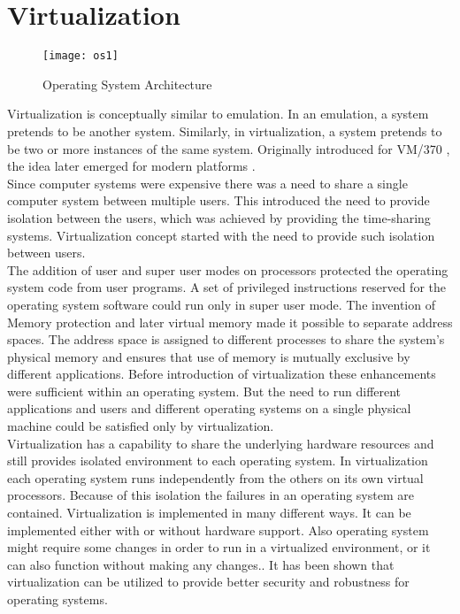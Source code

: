 \section{Virtualization}

\begin{figure}[!ht]
\centering
\texttt{[image: os1]}
\caption{Operating System Architecture}
\label{fig:OS}
\end{figure}
Virtualization is conceptually similar to emulation. In an emulation, a system pretends to be another system. Similarly, in virtualization, a system pretends to be two or more instances of the same system. Originally introduced for VM/370 \cite{Creasy:1981:OVT:1664853.1664863}, the idea later emerged for modern platforms \cite{Bugnion:1997:DRC:265924.265930}\cite{Rosenblum:2004:RVM:1016998.1017000}. 
\\
Since computer systems were expensive there was a need to share a single computer system between multiple users. This introduced the need to provide isolation between the users, which was achieved by providing the time-sharing systems. Virtualization concept started with the need to provide such isolation between users. 
\\
The addition of user and super user modes on processors protected the operating system code from user programs. A set of privileged instructions reserved for the operating system software could run only in super user mode. The invention of Memory protection and later virtual memory made it possible to separate address spaces. The address space is assigned to different processes to share the system's physical memory and ensures that use of memory is mutually exclusive by different applications. Before introduction of virtualization these enhancements were sufficient within an operating system. But the need to run different applications and users and different operating systems on a single physical machine could be satisfied only by virtualization.\cite{Crosby:2006:VR:1189276.1189289}
\\
Virtualization has a capability to share the underlying hardware resources and still provides isolated environment to each operating system. In virtualization each operating system runs independently from the others on its own virtual processors. Because of this isolation the failures in an operating system are contained. Virtualization is implemented in many different ways. It can be implemented either with or without hardware support. Also operating system might require some changes in order to run in a virtualized environment, or it can also function without making any changes.\cite{Drepper:2008:CV:1348583.1348591}. It has been shown that virtualization can be utilized to provide better security and robustness for operating systems\cite{Fraser04safehardware}\cite{LeVasseur04UnmodifiedDriverReuse}\cite{Riley:2008:GPK:1433006.1433008}.

